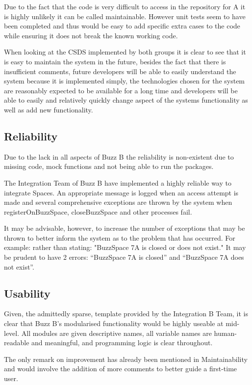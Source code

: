 \documentclass[12pt]{article}
\begin{document}
Due to the fact that the code is very difficult to access in the repository for A it is highly unlikely it can be called maintainable. However unit tests seem to have been completed and thus would be easy to add specific extra cases to the code while ensuring it does not break the known working code.

When looking at the CSDS implemented by both groups it is clear to see that it is easy to maintain the system in the future, besides the fact that there is insufficient comments, future developers will be able to easily understand the system because it is implemented simply, the technologies chosen for the system are reasonably expected to be available for a long time and developers will be able to easily and relatively quickly change aspect of the systems functionality as well as add new functionality.

\subsection{Reliability}
Due to the lack in all aspects of Buzz B the reliability is non-existent due to missing code, mock functions and not being able to run the packages.

The Integration Team of Buzz B have implemented a highly reliable way to integrate Spaces. An appropriate message is logged when an access attempt is made and several comprehensive exceptions are thrown by the system when registerOnBuzzSpace, closeBuzzSpace and other processes fail.

It may be advisable, however, to increase the number of exceptions that may be thrown to better inform the system as to the problem that has occurred. For example: rather than stating: "BuzzSpace 7A is closed or does not exist." It may be prudent to have 2 errors: “BuzzSpace 7A is closed” and “BuzzSpace 7A does not exist”.

\subsection{Usability}
Given, the admittedly sparse, template provided by the Integration B Team, it is clear that Buzz B’s modularised functionality would be highly useable at mid-level. All modules are given descriptive names, all variable names are human-readable and meaningful, and programming logic is clear throughout. 

The only remark on improvement has already been mentioned in Maintainability and would involve the addition of more comments to better guide a first-time user.
\end{document}
